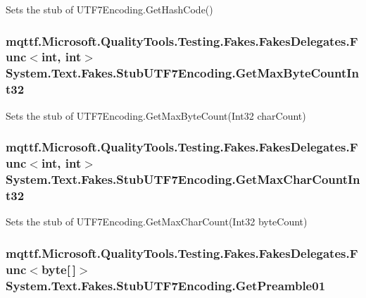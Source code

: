 Sets the stub of U\-T\-F7\-Encoding.\-Get\-Hash\-Code()

\hypertarget{class_system_1_1_text_1_1_fakes_1_1_stub_u_t_f7_encoding_a99c4e8d76b093fbfcec27f4443fbff77}{
\subsubsection[{Get\-Max\-Byte\-Count\-Int32}]{\setlength{\rightskip}{0pt plus 5cm}mqttf.\-Microsoft.\-Quality\-Tools.\-Testing.\-Fakes.\-Fakes\-Delegates.\-Func$<$int, int$>$ System.\-Text.\-Fakes.\-Stub\-U\-T\-F7\-Encoding.\-Get\-Max\-Byte\-Count\-Int32}}\label{class_system_1_1_text_1_1_fakes_1_1_stub_u_t_f7_encoding_a99c4e8d76b093fbfcec27f4443fbff77}


Sets the stub of U\-T\-F7\-Encoding.\-Get\-Max\-Byte\-Count(\-Int32 char\-Count)

\hypertarget{class_system_1_1_text_1_1_fakes_1_1_stub_u_t_f7_encoding_adec0a3c2e8f895b4e391065953e7cee2}{
\subsubsection[{Get\-Max\-Char\-Count\-Int32}]{\setlength{\rightskip}{0pt plus 5cm}mqttf.\-Microsoft.\-Quality\-Tools.\-Testing.\-Fakes.\-Fakes\-Delegates.\-Func$<$int, int$>$ System.\-Text.\-Fakes.\-Stub\-U\-T\-F7\-Encoding.\-Get\-Max\-Char\-Count\-Int32}}\label{class_system_1_1_text_1_1_fakes_1_1_stub_u_t_f7_encoding_adec0a3c2e8f895b4e391065953e7cee2}


Sets the stub of U\-T\-F7\-Encoding.\-Get\-Max\-Char\-Count(\-Int32 byte\-Count)

\hypertarget{class_system_1_1_text_1_1_fakes_1_1_stub_u_t_f7_encoding_a119821dd5c20c06ef967846e0350470c}{
\subsubsection[{Get\-Preamble01}]{\setlength{\rightskip}{0pt plus 5cm}mqttf.\-Microsoft.\-Quality\-Tools.\-Testing.\-Fakes.\-Fakes\-Delegates.\-Func$<$byte\mbox{[}$\,$\mbox{]}$>$ System.\-Text.\-Fakes.\-Stub\-U\-T\-F7\-Encoding.\-Get\-Preamble01}}\label{class_system_1_1_text_1_1_fakes_1_1_stub_u_t_f7_encoding_a119821dd5c20c06ef967846e0350470c}


